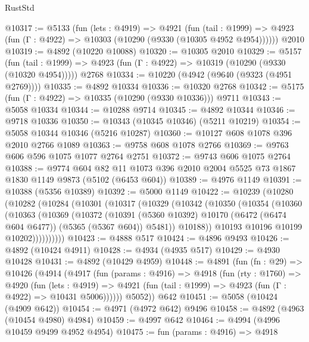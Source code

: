 \begin{lexlean}{RustStd}
\begin{coremodule}
@10317 := @5133
    (fun (lets : @4919) =>
    @4921
      (fun (tail : @1999) =>
      @4923 (fun (Γ : @4922) => @10303 (@10290 (@9330 (@10305 @4952 @4954))))))
    @2010
@10319 := @4892 (@10220 @10088)
@10320 := @10305 @2010
@10329 := @5157
    (fun (tail : @1999) => @4923 (fun (Γ : @4922) => @10319 (@10290 (@9330 (@10320 @4954)))))
    @2768
@10334 := @10220 (@4942 (@9640 (@9323 (@4951 @2769))))
@10335 := @4892 @10334
@10336 := @10320 @2768
@10342 := @5175 (fun (Γ : @4922) => @10335 (@10290 (@9330 @10336))) @9711
@10343 := @5058 @10334
@10344 := @10288 @9714
@10345 := @4892 @10344
@10346 := @9718 @10336
@10350 := @10343 (@10345 @10346) (@5211 @10219)
@10354 := @5058 @10344 @10346 (@5216 @10287)
@10360 := @10127 @608 @1078 @396 @2010 @2766 @1089
@10363 := @9758 @608 @1078 @2766
@10369 := @9763 @606 @596 @1075 @1077 @2764 @2751
@10372 := @9743 @606 @1075 @2764
@10388 := @9774
    @604
    @82
    @11
    @1073
    @396
    @2010
    @2004
    @5525
    @73
    @1867
    @1830
    @1149
    @9873
    (@5102 (@6453 @604))
@10389 := @4976 @1149
@10391 := @10388 (@5356 @10389)
@10392 := @5000 @1149
@10422 := @10239
    (@10280
      (@10282
        (@10284
          (@10301
            (@10317
              (@10329
                (@10342
                  (@10350
                    (@10354
                      (@10360
                        (@10363
                          (@10369
                            (@10372
                              (@10391
                                (@5360 @10392)
                                @10170
                                (@6472 (@6474 @604 @6477))
                                (@5365 (@5367 @604))
                                @5481))
                            @10188))
                        @10193
                        @10196
                        @10199
                        @10202))))))))))
@10423 := @4888 @517
@10424 := @4896 @9493
@10426 := @4892 (@10424 @4911)
@10428 := @4934 (@4935 @517)
@10429 := @4930 @10428
@10431 := @4892 (@10429 @4959)
@10448 := @4891
    (fun (fn : @29) =>
    @10426
      (@4914
        (@4917
          (fun (params : @4916) =>
          @4918
            (fun (rty : @1760) =>
            @4920
              (fun (lets : @4919) =>
              @4921 (fun (tail : @1999) => @4923 (fun (Γ : @4922) => @10431 @5006))))))
        @5052))
    @642
@10451 := @5058 (@10424 (@4909 @642))
@10454 := @4971 (@4972 @642) @9496
@10458 := @4892 (@4963 (@10454 @4980) @4984)
@10459 := @4997 @642
@10464 := @4994 (@4996 @10459 @9499 @4952 @4954)
@10475 := fun (params : @4916) =>
  @4918

\end{coremodule}
\end{lexlean}
